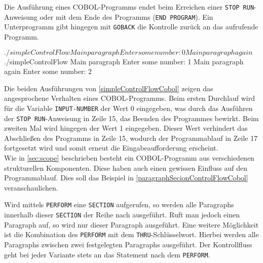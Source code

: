 Die Ausführung eines COBOL-Programms endet beim Erreichen einer \texttt{STOP RUN}-Anweisung oder mit dem Ende des Programms (\texttt{END PROGRAM}). Ein Unterprogramm gibt hingegen mit \texttt{GOBACK} die Kontrolle zurück an das aufrufende Programm.\\

\sepCodeAndOutputCheck
\begin{shellwindow}
$ ./simpleControlFlow 
Main paragraph
Enter some number: 0
Main paragraph again
$ ./simpleControlFlow 
Main paragraph
Enter some number: 1 
Main paragraph again
Enter some number: 2
\end{shellwindow}

Die beiden Ausführungen von \autoref{simpleControlFlowCobol} zeigen das angesprochene Verhalten eines COBOL-Programms. Beim ersten Durchlauf wird für die Variable \texttt{INPUT-NUMBER} der Wert 0 eingegeben, was durch das Ausführen der \texttt{STOP RUN}-Anweisung in Zeile 15, das Beenden des Programmes bewirkt. Beim zweiten Mal wird hingegen der Wert 1 eingegeben. Dieser Wert verhindert das Abschließen des Programms in Zeile 15, wodurch der Programmablauf in Zeile 17 fortgesetzt wird und somit erneut die Eingabeaufforderung erscheint.\\

Wie in \autoref{sec:scope} beschrieben besteht ein COBOL-Programm aus verschiedenen strukturellen Komponenten. Diese haben auch einen gewissen Einfluss auf den Programmablauf. Dies soll das Beispiel in \autoref{paragraphSecionControlFlowCobol} veranschaulichen.\\

\sepCodeAndOutputCheck
{}

Wird mittels \texttt{PERFORM} eine \texttt{SECTION} aufgerufen, so werden alle Paragraphs innerhalb dieser \texttt{SECTION} der Reihe nach ausgeführt. Ruft man jedoch einen Paragraph auf, so wird nur dieser Paragraph ausgeführt. Eine weitere Möglichkeit ist die Kombination des \texttt{PERFORM} mit dem \texttt{THRU}-Schlüsselwort. Hierbei werden alle Paragraphs zwischen zwei festgelegten Paragraphs ausgeführt. Der Kontrollfluss geht bei jeder Variante stets an das Statement nach dem \texttt{PERFORM}.\\

